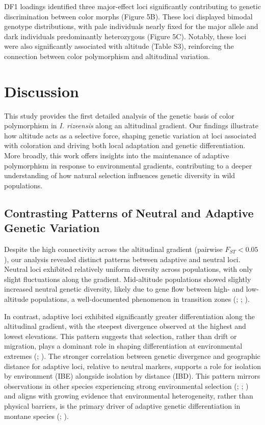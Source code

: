 \documentclass[9pt,a4paper,twoside]{rho-class/rho}
\begin{document}
        DF1 loadings identified three major-effect loci significantly contributing to genetic discrimination between color morphs (Figure 5B). These loci displayed bimodal genotype distributions, with pale individuals nearly fixed for the major allele and dark individuals predominantly heterozygous (Figure 5C). Notably, these loci were also significantly associated with altitude (Table S3), reinforcing the connection between color polymorphism and altitudinal variation.


\section{Discussion}

This study provides the first detailed analysis of the genetic basis of color polymorphism in \textit{I. rizeensis} along an altitudinal gradient. Our findings illustrate how altitude acts as a selective force, shaping genetic variation at loci associated with coloration and driving both local adaptation and genetic differentiation. More broadly, this work offers insights into the maintenance of adaptive polymorphism in response to environmental gradients, contributing to a deeper understanding of how natural selection influences genetic diversity in wild populations.

\subsection{Contrasting Patterns of Neutral and Adaptive Genetic Variation}

Despite the high connectivity across the altitudinal gradient (pairwise $F_{ST}  <0.05$), our analysis revealed distinct patterns between adaptive and neutral loci. Neutral loci exhibited relatively uniform diversity across populations, with only slight fluctuations along the gradient. Mid-altitude populations showed slightly increased neutral genetic diversity, likely due to gene flow between high- and low-altitude populations, a well-documented phenomenon in transition zones (\cite{Byars2009}; \cite{Polato2017}; \cite{Cortázar-Chinarro2017}).

In contrast, adaptive loci exhibited significantly greater differentiation along the altitudinal gradient, with the steepest divergence observed at the highest and lowest elevations. This pattern suggests that selection, rather than drift or migration, plays a dominant role in shaping differentiation at environmental extremes (\cite{Raeymaekers2017}; \cite{Cortázar-Chinarro2017}). The stronger correlation between genetic divergence and geographic distance for adaptive loci, relative to neutral markers, supports a role for isolation by environment (IBE) alongside isolation by distance (IBD). This pattern mirrors observations in other species experiencing strong environmental selection (\cite{Jiang2019}; \cite{Wagutu2022}; \cite{Wakamiya2023}) and aligns with growing evidence that environmental heterogeneity, rather than physical barriers, is the primary driver of adaptive genetic differentiation in montane species (\cite{Zancolli2019}; \cite{Wagutu2022}).
\end{document}
